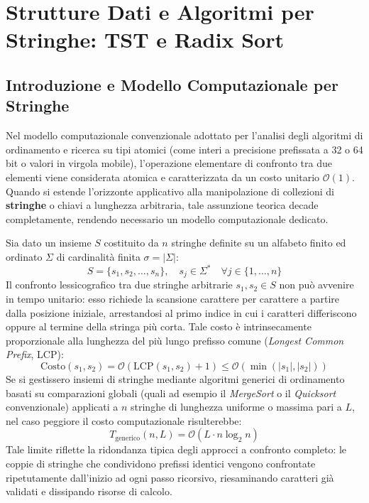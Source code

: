 \chapter{Strutture Dati e Algoritmi per Stringhe: TST e Radix Sort}
\label{chap:strutture-dati-stringhe-tst-radix-sort}

\FloatBarrier
\section{Introduzione e Modello Computazionale per Stringhe}
\label{sec:intro-modello-stringhe}

Nel modello computazionale convenzionale adottato per l'analisi degli algoritmi di ordinamento e ricerca su tipi atomici (come interi a precisione prefissata a 32 o 64 bit o valori in virgola mobile), l'operazione elementare di confronto tra due elementi viene considerata atomica e caratterizzata da un costo unitario $\mathcal{O}(1)$. Quando si estende l'orizzonte applicativo alla manipolazione di collezioni di \textbf{stringhe} o chiavi a lunghezza arbitraria, tale assunzione teorica decade completamente, rendendo necessario un modello computazionale dedicato.

Sia dato un insieme $S$ costituito da $n$ stringhe definite su un alfabeto finito ed ordinato $\Sigma$ di cardinalit\`a finita $\sigma = |\Sigma|$:
\begin{equation}
  S = \{s_1, s_2, \dots, s_n\}, \quad s_j \in \Sigma^* \quad \forall j \in \{1, \dots, n\}
\end{equation}
Il confronto lessicografico tra due stringhe arbitrarie $s_1, s_2 \in S$ non pu\`o avvenire in tempo unitario: esso richiede la scansione carattere per carattere a partire dalla posizione iniziale, arrestandosi al primo indice in cui i caratteri differiscono oppure al termine della stringa pi\`u corta. Tale costo \`e intrinsecamente proporzionale alla lunghezza del pi\`u lungo prefisso comune (\textit{Longest Common Prefix}, LCP):
\begin{equation}
  \text{Costo}(s_1, s_2) = \mathcal{O}(\text{LCP}(s_1, s_2) + 1) \le \mathcal{O}(\min(|s_1|, |s_2|))
\end{equation}
Se si gestissero insiemi di stringhe mediante algoritmi generici di ordinamento basati su comparazioni globali (quali ad esempio il \textit{MergeSort} o il \textit{Quicksort} convenzionale) applicati a $n$ stringhe di lunghezza uniforme o massima pari a $L$, nel caso peggiore il costo computazionale risulterebbe:
\begin{equation}
  T_{\text{generico}}(n, L) = \mathcal{O}(L \cdot n \log_2 n)
\end{equation}
Tale limite riflette la ridondanza tipica degli approcci a confronto completo: le coppie di stringhe che condividono prefissi identici vengono confrontate ripetutamente dall'inizio ad ogni passo ricorsivo, riesaminando caratteri gi\`a validati e dissipando risorse di calcolo.

